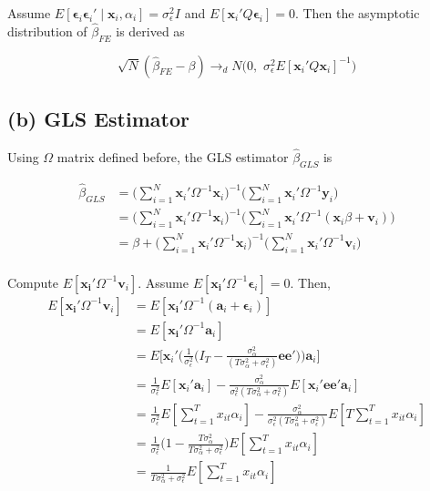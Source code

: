 \documentclass[12pt]{article}
\begin{document}
Assume $E[\mathbf{\epsilon}_i \mathbf{\epsilon}_i' \mid \mathbf{x}_i,\alpha_i] = \sigma_\epsilon^2 I$ and $E[\mathbf{x}_i' Q \mathbf{\epsilon}_i]=0$. Then the asymptotic distribution of $\widehat{\beta}_{FE}$ is derived as

\[
\sqrt{N} (\widehat{\beta}_{FE}-\beta) \rightarrow_{d} N\big(0,\,\, \sigma_\epsilon^2 E[\mathbf{x}_i' Q \mathbf{x}_i]^{-1}\big)
\]



\subsection*{(b) GLS Estimator}

Using $\Omega$ matrix defined before, the GLS estimator $\widehat{\beta}_{GLS}$ is

\begin{align*}
\widehat{\beta}_{GLS} &= \bigg(\sum_{i=1}^{N} \mathbf{x}_i' \Omega^{-1} \mathbf{x}_i\bigg)^{-1}\bigg(\sum_{i=1}^{N} \mathbf{x}_i'  \Omega^{-1} \mathbf{y}_i   \bigg)\\
&= \bigg(\sum_{i=1}^{N} \mathbf{x}_i' \Omega^{-1} \mathbf{x}_i\bigg)^{-1}\bigg(\sum_{i=1}^{N} \mathbf{x}_i' \Omega^{-1}( \mathbf{x}_i \beta+ \mathbf{v}_i) \bigg)\\
&=\beta+ \bigg(\sum_{i=1}^{N} \mathbf{x}_i' \Omega^{-1} \mathbf{x}_i\bigg)^{-1}\bigg(\sum_{i=1}^{N} \mathbf{x}_i' \Omega^{-1}\mathbf{v}_i \bigg)\\
\end{align*}

Compute $E[\mathbf{x_i}' \Omega^{-1} \mathbf{v}_i]$. Assume $E[\mathbf{x_i}' \Omega^{-1} \mathbf{\epsilon}_i]=0$. Then,
\begin{align*}
E[\mathbf{x_i}' \Omega^{-1} \mathbf{v}_i] &= E[\mathbf{x_i}' \Omega^{-1} (\mathbf{a}_i+\mathbf{\epsilon}_i)]\\
&= E[\mathbf{x_i}' \Omega^{-1} \mathbf{a}_i]\\
&= E \bigg[\mathbf{x}_i' \bigg(\frac{1}{\sigma_\epsilon^2} \big(I_T-\frac{\sigma_\alpha^2}{(T\sigma_\alpha^2 + \sigma_\epsilon^2)}\mathbf{ee'}\big) \bigg) \mathbf{a}_i \bigg]\\
&= \frac{1}{\sigma_\epsilon^2} E[\mathbf{x}_i' \mathbf{a}_i] - \frac{\sigma_\alpha^2}{\sigma_\epsilon^2 ( T\sigma_\alpha^2 + \sigma_\epsilon^2)} E[\mathbf{x}_i' \mathbf{ee'}\mathbf{a}_i]\\
&= \frac{1}{\sigma_\epsilon^2} E[\sum_{t=1}^T x_{it} \alpha_i] - \frac{\sigma_\alpha^2}{\sigma_\epsilon^2 ( T\sigma_\alpha^2 + \sigma_\epsilon^2)}  E[T\sum_{t=1}^T x_{it}\alpha_i]\\
&= \frac{1}{\sigma_\epsilon^2} \bigg(1- \frac{T\sigma_\alpha^2}{T\sigma_\alpha^2 + \sigma_\epsilon^2}\bigg)E[\sum_{t=1}^T x_{it}\alpha_i]\\
&= \frac{1}{T\sigma_\alpha^2 + \sigma_\epsilon^2} E[\sum_{t=1}^T x_{it}\alpha_i]
\end{align*}
\end{document}
